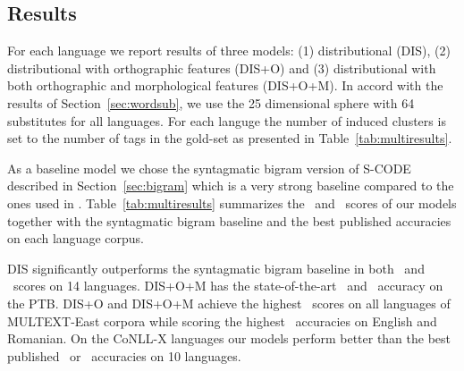\subsection{Results}
\label{sec:multires}

For each language we report results of three models: (1)
distributional (DIS), (2) distributional with orthographic features
(DIS+O) and (3) distributional with both orthographic and
morphological features (DIS+O+M).  In accord with the results of
Section~\ref{sec:wordsub}, we use the 25 dimensional sphere with 64
substitutes for all languages.  For each languge the number of induced
clusters is set to the number of tags in the gold-set as presented in
Table~\ref{tab:multiresults}.

As a baseline model we chose the syntagmatic bigram version of S-CODE
described in Section~\ref{sec:bigram} which is a very strong baseline
compared to the ones used in
\cite{christodoulopoulos-goldwater-steedman:2011:EMNLP}.
Table~\ref{tab:multiresults} summarizes the \mto\ and \vm\ scores of our
models together with the syntagmatic bigram baseline and the best
published accuracies on each language corpus.  

DIS significantly outperforms the syntagmatic bigram baseline in both
\mto\ and \vm\ scores on 14 languages.  DIS+O+M has the
state-of-the-art \mto\ and \vm\ accuracy on the PTB.  DIS+O and
DIS+O+M achieve the highest \mto\ scores on all languages of
MULTEXT-East corpora while scoring the highest \vm\ accuracies on
English and Romanian.  On the CoNLL-X languages our models perform
better than the best published \mto\ or \vm\ accuracies on 10
languages.

